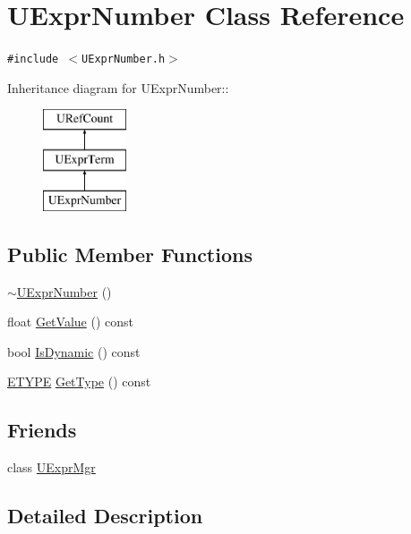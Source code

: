 \hypertarget{class_u_expr_number}{
\section{UExprNumber Class Reference}
\label{class_u_expr_number}
}
{\tt \#include $<$UExprNumber.h$>$}

Inheritance diagram for UExprNumber::\begin{figure}[H]
\begin{center}
\leavevmode
\includegraphics[height=3cm]{class_u_expr_number}
\end{center}
\end{figure}
\subsection*{Public Member Functions}
\begin{CompactItemize}
\item 
\hyperlink{class_u_expr_number_8ee536f5a9154d90d0a0a6710ca8a6f0}{$\sim$UExprNumber} ()
\item 
float \hyperlink{class_u_expr_number_bbbd099fb6900e6f749774b37599a64b}{GetValue} () const 
\item 
bool \hyperlink{class_u_expr_number_497a19a47c735974f54b0a50b8e2d869}{IsDynamic} () const 
\item 
\hyperlink{class_u_expr_term_20f132fb3c5e0228623e4268ba0d06c2}{ETYPE} \hyperlink{class_u_expr_number_e0235cdd37c30e7cfa51bb3f8a739e05}{GetType} () const 
\end{CompactItemize}
\subsection*{Friends}
\begin{CompactItemize}
\item 
class \hyperlink{class_u_expr_number_aba1a84b84f2ff7cab4b76539215bd34}{UExprMgr}
\end{CompactItemize}


\subsection{Detailed Description}


